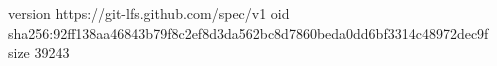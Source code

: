 version https://git-lfs.github.com/spec/v1
oid sha256:92ff138aa46843b79f8c2ef8d3da562bc8d7860beda0dd6bf3314c48972dec9f
size 39243
